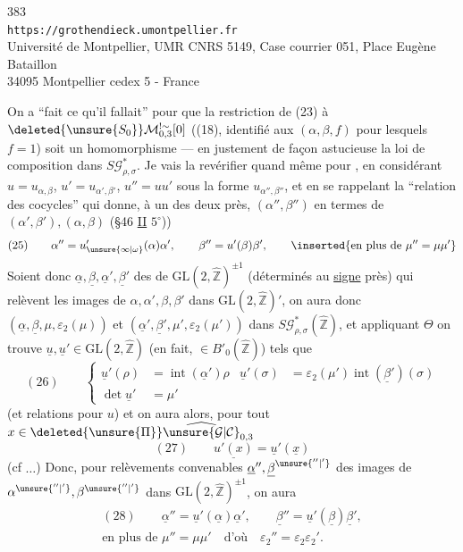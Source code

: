 \begin{center}
383\\
\texttt{https://grothendieck.umontpellier.fr}\\
Université de Montpellier, UMR CNRS 5149, Case courrier 051, Place Eugène Bataillon\\
34095 Montpellier cedex 5 - France
\end{center}

On a ``fait ce qu'il fallait'' pour que la restriction de (23) à $\deleted{\unsure{S_0}}\mathcal M_{0,3}^{!\sim}[0]$ ((18), identifié aux $(\alpha,\beta,f)$ pour lesquels $f=1$) soit un homomorphisme  --- en  justement de façon astucieuse  la loi de composition dans $S\mathcal G_{\rho,\sigma}^{*}$.
Je vais la revérifier quand même pour , en considérant $u=u_{\alpha,\beta}$, $u'=u_{\alpha',\beta'}$, $u''=uu'$ sous la forme $u_{\alpha'',\beta''}$, et en se rappelant la ``relation des cocycles'' qui donne, à un des deux  près, $(\alpha'',\beta'')$ en termes de $(\alpha',\beta'),(\alpha,\beta)$ (\S 46 \uline{II} $5^\circ$))
\[
(25)\qquad
\alpha''=u'_{\unsure{\infty|\omega}}(\alpha)\alpha',\qquad
\beta''=u'(\beta)\beta',\qquad
\inserted{\text{en plus de }\mu''=\mu\mu'}
\]
Soient donc $\underline\alpha,\underline\beta,\underline\alpha',\underline\beta'$ des   de $\mathrm{GL}(2,\widehat{\mathbb Z})^{\pm1}$ (déterminés au \uline{signe} près) qui relèvent les images de $\alpha,\alpha',\beta,\beta'$ dans $\mathrm{GL}(2,\widehat{\mathbb Z})'$, on aura donc $(\underline\alpha,\underline\beta,\mu,\varepsilon_2(\mu))$ et $(\underline\alpha',\underline\beta',\mu',\varepsilon_2(\mu'))$ dans $S\mathcal G_{\rho,\sigma}^{*}(\widehat{\mathbb Z})$, et appliquant $\Theta$ on trouve $\underline u,\underline u'\in\mathrm{GL}(2,\widehat{\mathbb Z})$ (en fait, $\in B'_0(\widehat{\mathbb Z})$) tels que
\[
(26)\qquad
\left\{\begin{aligned}
\underline u'(\rho)&=\operatorname{int}(\underline\alpha')\rho
&\underline u'(\sigma)&=\varepsilon_2(\mu')\operatorname{int}(\underline\beta')(\sigma)\\
\det\underline u'&=\mu'
\end{aligned}\right.
\]
(et relations  pour $u$)
et on aura alors, pour tout $x\in\deleted{\unsure{\Pi}}\widehat{\unsure{\mathcal G|\mathcal C}}_{0,3}$
\[
(27)\qquad \underline{u'(x)}=\underline u'(\underline x)
\]
(cf $\ldots$) Donc, pour  relèvements convenables $\underline\alpha'',\underline\beta^{\unsure{''|'}}$ des images de $\alpha^{\unsure{''|'}},\beta^{\unsure{''|'}}$ dans $\mathrm{GL}(2,\widehat{\mathbb Z})^{\pm1}$, on aura
\[
\begin{gathered}
(28)\qquad
\underline\alpha''=\underline u'(\underline\alpha)\underline\alpha',\qquad
\underline\beta''=\underline u'(\underline\beta)\underline\beta',\\
\text{en plus de }\mu''=\mu\mu'\quad\text{d'où}\quad
\varepsilon_2''=\varepsilon_2\varepsilon_2'.
\end{gathered}
\]

